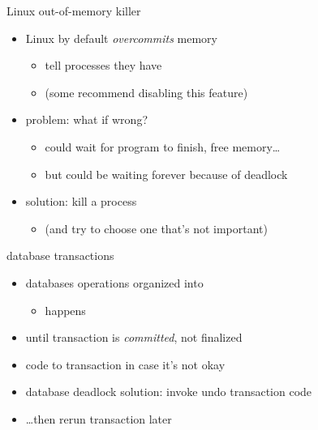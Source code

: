 \begin{frame}{Linux out-of-memory killer}
\begin{itemize}
\item Linux by default \textit{overcommits} memory
    \begin{itemize}
    \item tell processes they have 
    \item (some recommend disabling this feature)
    \end{itemize}
\item problem: what if wrong?
    \begin{itemize}
    \item could wait for program to finish, free memory\ldots
    \item but could be waiting forever because of deadlock
    \end{itemize}
\item solution: kill a process
    \begin{itemize}
    \item (and try to choose one that's not important)
    \end{itemize}
\end{itemize}
\end{frame}

\begin{frame}{database transactions}
\begin{itemize}
\item databases operations organized into \textit{}
    \begin{itemize}
    \item happens 
    \end{itemize}
\item until transaction is \textit{committed}, not finalized
\item code to  transaction in case it's not okay
\vspace{.5cm}
\item database deadlock solution: invoke undo transaction code
\item \ldots then rerun transaction later
\end{itemize}
\end{frame}

